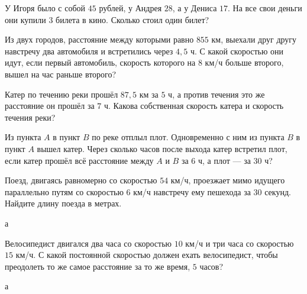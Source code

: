\begin{class}[number=1]
\begin{listofex}
		\item У Игоря было с собой \( 45 \) рублей, у Андрея \( 28 \), а у Дениса \( 17 \). На все свои деньги они купили \( 3 \) билета в кино. Сколько стоил один билет?  
		\item Из двух городов, расстояние между которыми равно \( 855 \) км, выехали друг другу навстречу два автомобиля и встретились через \( 4,5 \) ч. С какой скоростью они идут, если первый автомобиль, скорость которого на 8 км/ч больше второго, вышел на час раньше второго?
		\item Катер по течению реки прошёл \( 87,5 \) км за \( 5 \) ч, а против течения это же расстояние он прошёл за \( 7 \) ч. Какова собственная скорость катера и скорость течения реки?
		\item Из пункта \( A \) в пункт \( B \) по реке отплыл плот. Одновременно с ним из пункта \( B \) в пункт \( A \) вышел катер. Через сколько часов после выхода катер встретил плот, если катер прошёл всё расстояние между \( A \) и \( B \) за \( 6 \) ч, а плот --- за \( 30 \) ч?
		\item Поезд, двигаясь равномерно со скоростью \( 54 \) км/ч, проезжает мимо идущего параллельно путям со скоростью \( 6 \) км/ч навстречу ему пешехода за \( 30 \) секунд. Найдите длину поезда в метрах.
	\end{listofex}
\end{class}

\begin{class}[number=2]
	\begin{listofex}
		\item а
	\end{listofex}
\end{class}

\begin{homework}[number=1]
	\begin{listofex}
		\item Велосипедист двигался два часа со скоростью \( 10 \) км/ч  и три часа со скоростью \( 15 \) км/ч. С какой постоянной скоростью должен  ехать велосипедист, чтобы преодолеть то же самое расстояние за то же время, \( 5 \) часов?    
	\end{listofex}
\end{homework}

\begin{class}[number=3]
	\begin{listofex}
		\item а
	\end{listofex}
\end{class}


